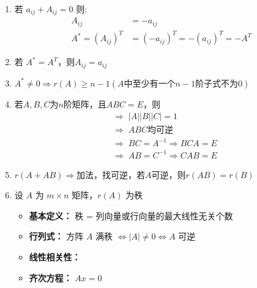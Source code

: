 \documentclass[./linear_algebra.tex]{subfiles}
\begin{document}
    \begin{enumerate}
        \item 若 $a_{ij} + A_{ij} = 0$ 则:
        \[
            \begin{aligned}
                A_{ij} &= -a_{ij} \\
                A^* = (A_{ij})^T &= (-a_{ij})^T = -(a_{ij})^T = -A^T
            \end{aligned}
        \]
        \item 若 $A^* = A^T$，则$A_{ij} = a_{ij}$
        \item $A^* \neq 0 \Rightarrow r(A) \ge n - 1(A\text{中至少有一个}n-1\text{阶子式不为0})$
        \item 若$A, B, C$为$n$阶矩阵，且$ABC = E$，则
        \begin{align*}
            &\Rightarrow\; |A||B||C| = 1 \\
            &\Rightarrow\; A B C\text{均可逆} \\
            &\Rightarrow\; BC = A^{-1} \Rightarrow BCA = E \\
            &\Rightarrow\; AB = C^{-1} \Rightarrow CAB = E
        \end{align*}
        \item $r(A + AB) \Rightarrow \text{加法，找可逆，若}A\text{可逆，则}r(AB) = r(B)$
        \item 设 $A$ 为 $m \times n$ 矩阵，$r(A)$ 为秩
        \begin{itemize}
            \item \textbf{基本定义：} 秩 = 列向量或行向量的最大线性无关个数
            \item \textbf{行列式：} 方阵 $A$ 满秩 $\Leftrightarrow |A| \neq 0 \Leftrightarrow A$ 可逆
            \item \textbf{线性相关性：}
            \item \textbf{齐次方程：} $Ax = 0$

\end{itemize}
\end{enumerate}
\end{document}
